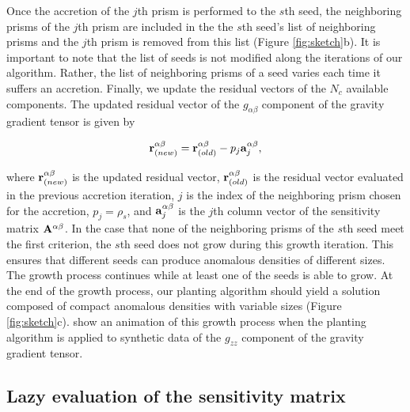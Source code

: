 \indent
Once the accretion of the $j$th
prism is performed to the $s$th seed, the neighboring prisms of the
$j$th prism are included in the the $s$th seed's list of neighboring prisms
and the $j$th prism is removed from this list (Figure
\ref{fig:sketch}b).
It is important to note that the list of seeds is not modified along the
iterations of our algorithm. Rather, the list of neighboring prisms of a seed
varies each time it suffers an accretion.
Finally, we update the residual vectors of the $N_c$
available components. The updated residual vector of the
$g_{\alpha\beta}$ component of the gravity gradient tensor is given by

\begin{equation}
\mathbf{r}_{(new)}^{\alpha\beta} =
\mathbf{r}_{(old)}^{\alpha\beta} - p_j\mathbf{a}_j^{\alpha\beta},
\label{eq:residual_update}
\end{equation}

\noindent
where $\mathbf{r}_{(new)}^{\alpha\beta}$ is the
updated residual vector,
$\mathbf{r}_{(old)}^{\alpha\beta}$ is the
residual vector evaluated in the previous accretion iteration, $j$ is the index
of the neighboring prism chosen for the accretion, $p_j = \rho_s$, and
$\mathbf{a}_j^{\alpha\beta}$ is the $j$th column vector
of the sensitivity matrix $\mathbf{A}^{\alpha\beta}$.
In the case that none of the neighboring prisms of the $s$th seed meet the first
criterion, the $s$th seed does not grow during this growth iteration. 
This ensures that different seeds can produce anomalous densities of different
sizes.
The growth process continues while at least one of the seeds is able to grow.
At the end of the growth process, our planting algorithm should yield a solution
composed of compact anomalous densities with variable sizes
(Figure \ref{fig:sketch}c).
\citet{Uieda2012} show an animation of this growth process
when the planting algorithm is applied to
synthetic data of the $g_{zz}$ component of the gravity gradient tensor.


\subsection{Lazy evaluation of the sensitivity matrix}

